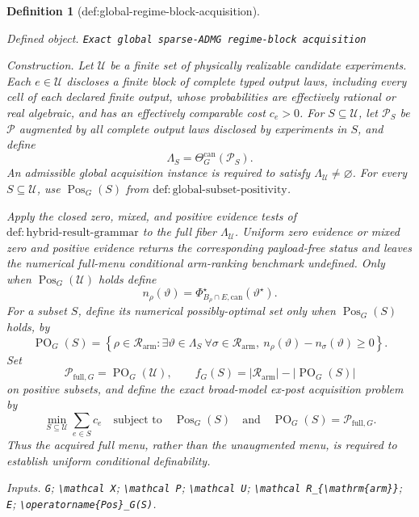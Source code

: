 \documentclass{article}
\newtheorem{definition}{Definition}
\begin{document}
\begin{definition}[def:global-regime-block-acquisition]\label{def:global-regime-block-acquisition}
\par\smallskip\noindent\emph{Defined object.} \texttt{Exact global sparse-\allowbreak{}ADMG regime-\allowbreak{}block acquisition}
\par\smallskip\noindent\emph{Construction.} Let \(\mathcal U\) be a finite set of physically realizable candidate experiments.  Each \(e\in\mathcal U\) discloses a finite block of complete typed output laws, including every cell of each declared finite output, whose probabilities are effectively rational or real algebraic, and has an effectively comparable cost \(c_e>0\).  For \(S\subseteq\mathcal U\), let \(\mathcal P_S\) be \(\mathcal P\) augmented by all complete output laws disclosed by experiments in \(S\), and define
\[
\Lambda_S=\Theta_G^{\mathrm{can}}(\mathcal P_S).
\]
An admissible global acquisition instance is required to satisfy \(\Lambda_{\mathcal U}\ne\varnothing\).  For every \(S\subseteq\mathcal U\), use \(\operatorname{Pos}_G(S)\) from \(\mathrm{def:global\text{-}subset\text{-}positivity}\).

Apply the closed zero, mixed, and positive evidence tests of \(\mathrm{def:hybrid\text{-}result\text{-}grammar}\) to the full fiber \(\Lambda_{\mathcal U}\).  Uniform zero evidence or mixed zero and positive evidence returns the corresponding payload-free status and leaves the numerical full-menu conditional arm-ranking benchmark undefined.  Only when \(\operatorname{Pos}_G(\mathcal U)\) holds define
\[
n_\rho(\vartheta)
=\Phi_{B_\rho\cap E,\mathrm{can}}^\star(\vartheta^\star).
\]
For a subset \(S\), define its numerical possibly-optimal set only when \(\operatorname{Pos}_G(S)\) holds, by
\[
\operatorname{PO}_G(S)
=\left\{\rho\in\mathcal R_{\mathrm{arm}}:
\exists\vartheta\in\Lambda_S\ \forall\sigma\in\mathcal R_{\mathrm{arm}},\ 
n_\rho(\vartheta)-n_\sigma(\vartheta)\geq0\right\}.
\]
Set
\[
\mathcal P_{\mathrm{full},G}=\operatorname{PO}_G(\mathcal U),
\qquad
f_G(S)=|\mathcal R_{\mathrm{arm}}|-|\operatorname{PO}_G(S)|
\]
on positive subsets, and define the exact broad-model ex-post acquisition problem by
\[
\min_{S\subseteq\mathcal U}\sum_{e\in S}c_e
\quad\text{subject to}\quad
\operatorname{Pos}_G(S)
\quad\text{and}\quad
\operatorname{PO}_G(S)=\mathcal P_{\mathrm{full},G}.
\]
Thus the acquired full menu, rather than the unaugmented menu, is required to establish uniform conditional definability.
\par\smallskip\noindent\emph{Inputs.} \texttt{G}; \texttt{\textbackslash{}\allowbreak{}mathcal X}; \texttt{\textbackslash{}\allowbreak{}mathcal P}; \texttt{\textbackslash{}\allowbreak{}mathcal U}; \texttt{\textbackslash{}\allowbreak{}mathcal R\_\allowbreak{}\{\textbackslash{}\allowbreak{}mathrm\{arm\}\allowbreak{}\}\allowbreak{}}; \texttt{E}; \texttt{\textbackslash{}\allowbreak{}operatorname\{Pos\}\allowbreak{}\_\allowbreak{}G(S)}.
\end{definition}
\end{document}

